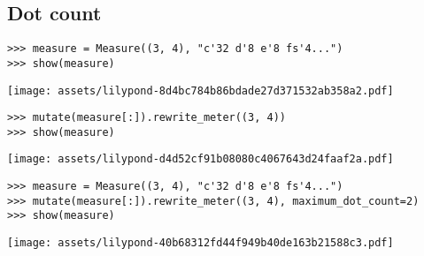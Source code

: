 \subsection{Dot count} %

\begin{comment}
<abjad>
measure = Measure((3, 4), "c'32 d'8 e'8 fs'4...")
show(measure)
</abjad>
\end{comment}

\begin{singlespacing}
\vspace{-0.5\baselineskip}
\begin{lstlisting}
>>> measure = Measure((3, 4), "c'32 d'8 e'8 fs'4...")
>>> show(measure)
\end{lstlisting}
\noindent\texttt{[image: assets/lilypond-8d4bc784b86bdade27d371532ab358a2.pdf]}
\end{singlespacing}

\begin{comment}
<abjad>
mutate(measure[:]).rewrite_meter((3, 4))
show(measure)
</abjad>
\end{comment}

\begin{singlespacing}
\vspace{-0.5\baselineskip}
\begin{lstlisting}
>>> mutate(measure[:]).rewrite_meter((3, 4))
>>> show(measure)
\end{lstlisting}
\noindent\texttt{[image: assets/lilypond-d4d52cf91b08080c4067643d24faaf2a.pdf]}
\end{singlespacing}

\begin{comment}
<abjad>
measure = Measure((3, 4), "c'32 d'8 e'8 fs'4...")
mutate(measure[:]).rewrite_meter((3, 4), maximum_dot_count=2)
show(measure)
</abjad>
\end{comment}

\begin{singlespacing}
\vspace{-0.5\baselineskip}
\begin{lstlisting}
>>> measure = Measure((3, 4), "c'32 d'8 e'8 fs'4...")
>>> mutate(measure[:]).rewrite_meter((3, 4), maximum_dot_count=2)
>>> show(measure)
\end{lstlisting}
\noindent\texttt{[image: assets/lilypond-40b68312fd44f949b40de163b21588c3.pdf]}
\end{singlespacing}

